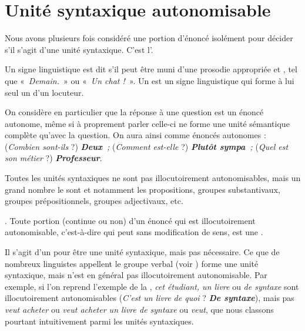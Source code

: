 \section{Unité syntaxique autonomisable}\label{sec:3.2.11}

Nous avons plusieurs fois considéré une portion d’énoncé isolément pour décider s’il s’agit d’une unité syntaxique. C’est l’.

{Un signe linguistique est dit  s’il peut être muni d’une prosodie appropriée et , tel que «~\textit{Demain.~}» ou «~\textit{Un chat !~}». Un  est un signe linguistique qui forme à lui seul un  d’un locuteur.}

On considère en particulier que la réponse à une question est un énoncé autonome, même si à proprement parler celle-ci ne forme une unité sémantique complète qu’avec la question. On aura ainsi comme énoncés autonomes : (\textit{Combien sont-ils} ?) \textbf{\textit{Deux~}}\textit{;} (\textit{Comment est-elle} ?) \textbf{\textit{Plutôt sympa~}}\textit{;} (\textit{Quel est son métier} ?) \textbf{\textit{Professeur}}.

Toutes les unités syntaxiques ne sont pas illocutoirement autonomisables, mais un grand nombre le sont et notamment les propositions, groupes substantivaux, groupes prépositionnels, groupes adjectivaux, etc.

{. Toute portion (continue ou non) d’un énoncé qui est illocutoirement autonomisable, c’est-à-dire qui peut  sans modification de sens, est une .}

Il s’agit d’un  pour être une unité syntaxique, mais pas nécessaire. Ce que de nombreux linguistes appellent le groupe verbal (voir ) forme une unité syntaxique, mais n’est en général pas illocutoirement autonomisable. Par exemple, si l’on reprend l’exemple de la , \textit{cet étudiant, un livre} ou \textit{de syntaxe} sont illocutoirement autonomisables (\textit{C’est un livre de quoi} ? \textbf{\textit{De syntaxe}}), mais pas \textit{veut acheter} ou \textit{veut acheter un livre de syntaxe} ou \textit{veut}, que nous classons pourtant intuitivement parmi les unités syntaxiques.

